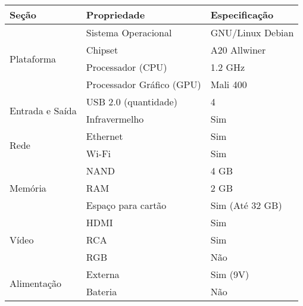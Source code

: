 \begin{tabular}{lll}
\toprule
Seção                            & Propriedade               & Especificação    \\
\midrule
\multirow{4}{*}{Plataforma}      & Sistema Operacional       & GNU/Linux Debian \\
                                 & Chipset                   & A20 Allwiner     \\
                                 & Processador (CPU)         & 1.2 GHz          \\
                                 & Processador Gráfico (GPU) & Mali 400         \\
                                 \midrule
\multirow{2}{*}{Entrada e Saída} & USB 2.0 (quantidade)      & 4                \\
                                 & Infravermelho             & Sim              \\
                                 \midrule
\multirow{2}{*}{Rede}            & Ethernet                  & Sim              \\
                                 & Wi-Fi                     & Sim              \\
                                 \midrule
\multirow{3}{*}{Memória}         & NAND                      & 4 GB             \\
                                 & RAM                       & 2 GB             \\
                                 & Espaço para cartão        & Sim (Até 32 GB)  \\
                                 \midrule
\multirow{3}{*}{Vídeo}           & HDMI                      & Sim              \\
                                 & RCA                       & Sim              \\
                                 & RGB                       & Não              \\ 
                                 \midrule
\multirow{2}{*}{Alimentação}     & Externa                   & Sim (9V)         \\
                                 & Bateria                   & Não              \\
                                 \bottomrule
\end{tabular}